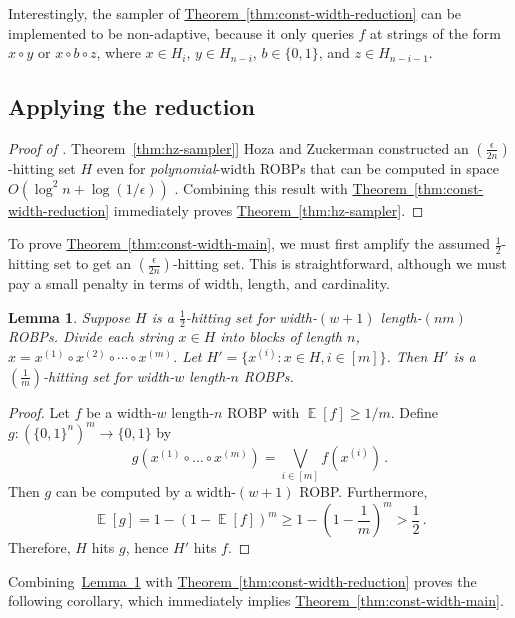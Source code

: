 \documentclass[10pt,a4paper]{article}
\newtheorem{lemma}[theorem]{Lemma}
\DeclareMathOperator*{\ExpVal}{\mathbb E}
\newcommand{\expref}[2]{\hyperref[#2]{#1~\ref*{#2}}}
\begin{document}
Interestingly, the sampler of \expref{Theorem}{thm:const-width-reduction} can be implemented to be non-adaptive, because it only queries $f$ at strings of the form $x \circ y$ or $x \circ b \circ z$, where $x \in H_i$, $y \in H_{n - i}$, $b \in \{0, 1\}$, and $z \in H_{n - i - 1}$.

\subsection{Applying the reduction}

\begin{proof}[Proof of \expref{Theorem}{thm:hz-sampler}]
Hoza and Zuckerman constructed an $\left(\frac{\epsilon}{2n}\right)$-hitting set $H$ even for \emph{polynomial}-width ROBPs that can be computed in space $O(\log^2 n + \log(1/\epsilon))$ \cite{HZ20}. Combining this result with \expref{Theorem}{thm:const-width-reduction} immediately proves \expref{Theorem}{thm:hz-sampler}.
\end{proof}

To prove \expref{Theorem}{thm:const-width-main}, we must first amplify the assumed $\frac{1}{2}$-hitting set to get an $\left(\frac{\epsilon}{2n}\right)$-hitting set. This is straightforward, although we must pay a small penalty in terms of width, length, and cardinality.
\begin{lemma} \label{lem:hitting-set-amplification}
Suppose $H$ is a $\frac{1}{2}$-hitting set for width-$(w + 1)$ length-$(nm)$ ROBPs. Divide each string $x \in H$ into blocks of length $n$, $x = x^{(1)} \circ x^{(2)} \circ \cdots \circ x^{(m)}$. Let $H' = \{x^{(i)} : x \in H, i \in [m]\}$. Then $H'$ is a $(\frac{1}{m})$-hitting set for width-$w$ length-$n$ ROBPs.
\end{lemma}

\begin{proof}
Let $f$ be a width-$w$ length-$n$ ROBP with $\ExpVal[f] \geq 1/m$. Define $g \colon (\{0, 1\}^n)^m \to \{0, 1\}$ by
$$
g(x^{(1)} \circ \dots \circ x^{(m)}) = \bigvee_{i \in [m]} f(x^{(i)})\,.
$$
Then $g$ can be computed by a width-$(w + 1)$ ROBP. Furthermore,
$$
\ExpVal[g] = 1 - (1 - \ExpVal[f])^m \geq 1 - \left(1 - \frac{1}{m}\right)^m > \frac{1}{2}\,.
$$
Therefore, $H$ hits $g$, hence $H'$ hits $f$.
\end{proof}

Combining~\expref{Lemma}{lem:hitting-set-amplification} with \expref{Theorem}{thm:const-width-reduction} proves the following corollary, which immediately implies \expref{Theorem}{thm:const-width-main}.
\end{document}
